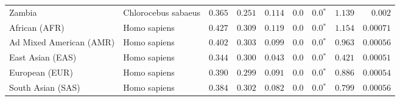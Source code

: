 \begin{center}
\begin{adjustbox}{width = 1\textwidth}
\begin{tabular}{|l|l|r|r|r|r|r|r|r|}
            Zambia        & Chlorocebus sabaeus        & $ 0.365$ & $ 0.251$ & $ 0.114$ & $0.0$ & $\bm{0.0{^*}}$ & $ 1.139$ & $ 0.002$ \\
            African (AFR)               & Homo sapiens        & $ 0.427$ & $ 0.309$ & $ 0.119$ & $0.0$ & $\bm{0.0{^*}}$ & $ 1.154$ & $0.00071$ \\
            Ad Mixed American (AMR)                 & Homo sapiens        & $ 0.402$ & $ 0.303$ & $ 0.099$ & $0.0$ & $\bm{0.0{^*}}$ & $ 0.963$ & $0.00056$ \\
            East Asian (EAS)              & Homo sapiens        & $ 0.344$ & $ 0.300$ & $ 0.043$ & $0.0$ & $\bm{0.0{^*}}$ & $ 0.421$ & $0.00051$ \\
            European (EUR)              & Homo sapiens        & $ 0.390$ & $ 0.299$ & $ 0.091$ & $0.0$ & $\bm{0.0{^*}}$ & $ 0.886$ & $0.00054$ \\
            South Asian (SAS)              & Homo sapiens        & $ 0.384$ & $ 0.302$ & $ 0.082$ & $0.0$ & $\bm{0.0{^*}}$ & $ 0.799$ & $0.00056$ \\
            \bottomrule
        \end{tabular}
    \end{adjustbox}
    \newpage
\end{center}


